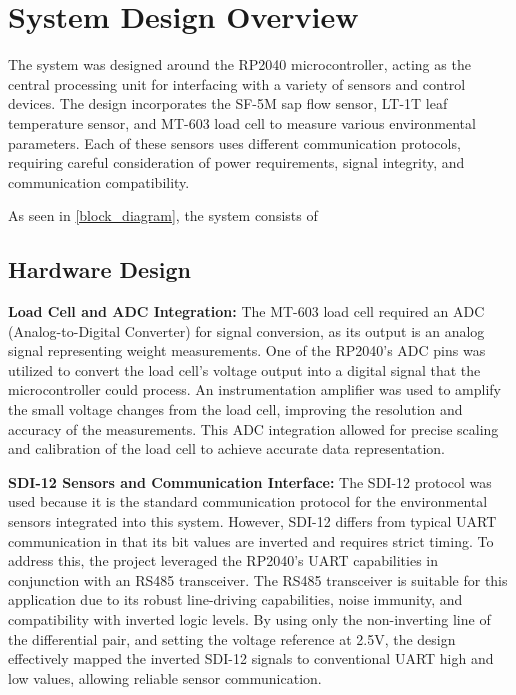 
\section{System Design Overview}

The system was designed around the RP2040 microcontroller, acting as the central 
processing unit for interfacing with a variety of sensors and control devices. 
The design incorporates the SF-5M sap flow sensor, LT-1T leaf temperature sensor, 
and MT-603 load cell to measure various environmental parameters. Each of these 
sensors uses different communication protocols, requiring careful consideration of 
power requirements, signal integrity, and communication compatibility.

As seen in \cref{block_diagram}, the system consists of 

\subsection{Hardware Design}
\textbf{Load Cell and ADC Integration:} The MT-603 load cell required an ADC (Analog-to-Digital Converter) for signal conversion, as its output is an analog signal representing weight measurements. One of the RP2040's ADC pins was utilized to convert the load cell's voltage output into a digital signal that the microcontroller could process. An instrumentation amplifier was used to amplify the small voltage changes from the load cell, improving the resolution and accuracy of the measurements. This ADC integration allowed for precise scaling and calibration of the load cell to achieve accurate data representation.

\textbf{SDI-12 Sensors and Communication Interface:} The SDI-12 protocol was used because it is the standard communication protocol for the environmental sensors integrated into this system. However, SDI-12 differs from typical UART communication in that its bit values are inverted and requires strict timing. To address this, the project leveraged the RP2040's UART capabilities in conjunction with an RS485 transceiver. The RS485 transceiver is suitable for this application due to its robust line-driving capabilities, noise immunity, and compatibility with inverted logic levels. By using only the non-inverting line of the differential pair, and setting the voltage reference at 2.5V, the design effectively mapped the inverted SDI-12 signals to conventional UART high and low values, allowing reliable sensor communication.

